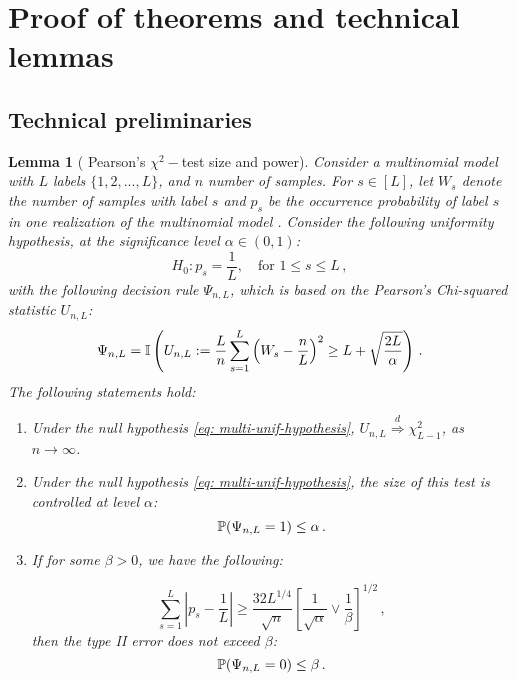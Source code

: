 \documentclass[11pt]{article}
\newtheorem{lemma}[propo]{Lemma}
\begin{document}
\section{Proof of theorems and technical lemmas}

\subsection{Technical preliminaries}


\begin{lemma}[  Pearson's $\chi^2-$test size and power] \label{lemma: multinomial-main}
Consider a multinomial model with $L$ labels $\{1,2,...,L\}$, and $n$ number of samples. For $s\in [L]$, let $W_s$ denote the number of samples with label $s$ and $p_s$  be the occurrence probability of label $s$ in one realization of the multinomial model .  Consider the following uniformity hypothesis, at the significance level $\alpha\in (0,1)$:
\begin{equation}\label{eq: multi-unif-hypothesis}
H_0: p_s=\frac{1}{L},\quad \text{for } 1\leq s \leq L\,,
\end{equation}
with the following decision rule $\Psi_{n,L}$, which is based on the Pearson's Chi-squared statistic $U_{n,L}$:
\[
\Psi_{n,L}= {\mathbb I}\left( U_{n,L}: =\frac{L}{n} \sum\limits_{s=1}^{L} \left(W_s-\frac{n}{L}\right)^2  \geq L+\sqrt{\frac{2L}{\alpha}} \right )\,.
\]
The following statements hold:
\begin{enumerate}
\item  Under the null hypothesis \eqref{eq: multi-unif-hypothesis}, $U_{n,L}\overset{d}{\Rightarrow} \chi^2_{L-1}$, as $n\rightarrow\infty$. %
%
\item  Under the null hypothesis \eqref{eq: multi-unif-hypothesis},  the size of this test is controlled at level $\alpha$:
\[
{\mathbb P}(\Psi_{n,L}=1)\leq \alpha\,.
\]
%
\item  If for some $\beta>0$, we have the following:

\[
\sum\limits_{s=1}^{L}\left|p_s-\frac{1}{L}\right| \geq\frac{32{L^{1/4}}}{\sqrt{n}}\left[\frac{1}{\sqrt{\alpha}}\vee\frac{1}{\beta}  \right]^{1/2}\,,
\]
then the type II error does not exceed $\beta$:
\[
{\mathbb P}(\Psi_{n,L}=0)\leq \beta\,.
\]
\end{enumerate}
\end{lemma}
\end{document}
